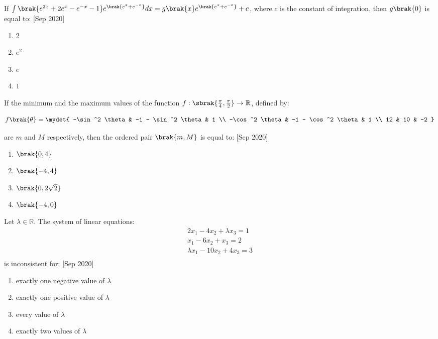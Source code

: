     \item If $\int \brak{e^{2x} + 2e^x - e^{-x} - 1} e^{\brak{e^x + e^{-x}}} dx = g\brak{x} e^{\brak{e^x + e^{-x}}} + c $, where $c$ is the constant of integration, then $g\brak{0}$ is equal to:
    \hfill{[Sep 2020]}
    \begin{enumerate}
        \item $2$
        \item $e^2$
        \item $e$
        \item $1$
    \end{enumerate}

    \item If the minimum and the maximum values of the function $f : \sbrak{\frac{\pi}{4}, \frac{\pi}{2}} \to \mathbb{R}$, defined by:

    $$
    f\brak{\theta} = \mydet{
    -\sin^2 \theta & -1 - \sin^2 \theta & 1 \\
    -\cos^2 \theta & -1 - \cos^2 \theta & 1 \\
    12 & 10 & -2
    }
    $$
    
    are $m$ and $M$ respectively, then the ordered pair $\brak{m, M}$ is equal to:
    \hfill{[Sep 2020]}
    
    \begin{enumerate}
        \item $\brak{0, 4}$
        \item $\brak{-4, 4}$
        \item $\brak{0, 2\sqrt{2}}$
        \item $\brak{-4, 0}$
    \end{enumerate}
    

    \item Let $\lambda \in \mathbb{R}$. The system of linear equations:
    \begin{align*}
    2x_1 - 4x_2 + \lambda x_3 = 1\\
    x_1 - 6x_2 + x_3 = 2\\
    \lambda x_1 - 10x_2 + 4x_3 = 3\\
    \end{align*}
    is inconsistent for:
    \hfill{[Sep 2020]}
    \begin{enumerate}
        \item exactly one negative value of $\lambda$
        \item exactly one positive value of $\lambda$
        \item every value of $\lambda$
        \item exactly two values of $\lambda$
    \end{enumerate}

